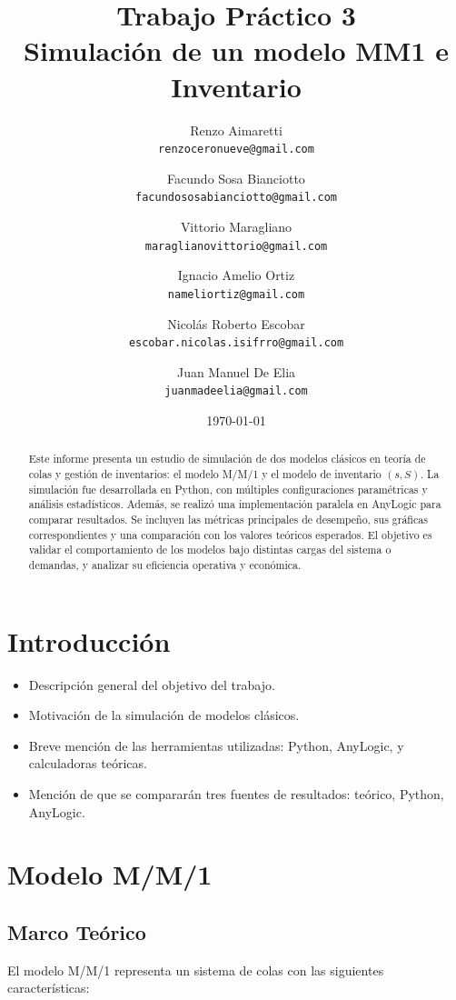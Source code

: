 \documentclass[12pt]{article}
\title{Trabajo Práctico 3 \\
Simulación de un modelo MM1 e Inventario}
\author{
    Renzo Aimaretti \\ \texttt{renzoceronueve@gmail.com}
    \and
    Facundo Sosa Bianciotto \\ \texttt{facundososabianciotto@gmail.com}
    \and
    Vittorio Maragliano \\ \texttt{maraglianovittorio@gmail.com}
    \and
    Ignacio Amelio Ortiz \\ \texttt{nameliortiz@gmail.com}
    \and
    Nicolás Roberto Escobar \\ \texttt{escobar.nicolas.isifrro@gmail.com}
    \and
    Juan Manuel De Elia \\ \texttt{juanmadeelia@gmail.com}
}
\date{\today}
\begin{document}
\maketitle
\newpage

\begin{abstract}
Este informe presenta un estudio de simulación de dos modelos clásicos en teoría de colas y gestión de inventarios: el modelo M/M/1 y el modelo de inventario $(s, S)$. La simulación fue desarrollada en Python, con múltiples configuraciones paramétricas y análisis estadísticos. Además, se realizó una implementación paralela en AnyLogic para comparar resultados. Se incluyen las métricas principales de desempeño, sus gráficas correspondientes y una comparación con los valores teóricos esperados. El objetivo es validar el comportamiento de los modelos bajo distintas cargas del sistema o demandas, y analizar su eficiencia operativa y económica.
\end{abstract}

\section{Introducción}
\begin{itemize}
    \item Descripción general del objetivo del trabajo.
    \item Motivación de la simulación de modelos clásicos.
    \item Breve mención de las herramientas utilizadas: Python, AnyLogic, y calculadoras teóricas.
    \item Mención de que se compararán tres fuentes de resultados: teórico, Python, AnyLogic.
\end{itemize}

\section{Modelo M/M/1}

\subsection{Marco Teórico}

El modelo M/M/1 representa un sistema de colas con las siguientes características:
\end{document}
